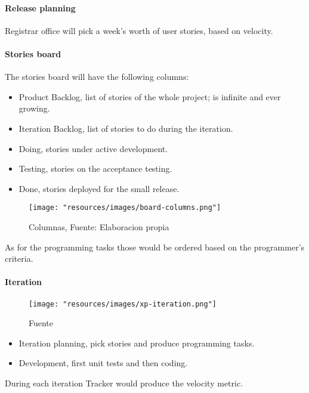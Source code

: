 \paragraph{Release planning} Registrar office will pick a week's worth of user stories, based on velocity.

\paragraph{Stories board} The stories board will have the following columns:
\begin{itemize}
    \item Product Backlog, list of stories of the whole project; is infinite and ever growing.
    \item Iteration Backlog, list of stories to do during the iteration.
    \item Doing, stories under active development.
    \item Testing, stories on the acceptance testing.
    \item Done, stories deployed for the small release.
\end{itemize}

\begin{figure}
    \texttt{[image: "resources/images/board-columns.png"]}
    \caption{Columnas, Fuente: Elaboracion propia}\label{fig:board-columns}
\end{figure}

As for the programming tasks those would be ordered based on the programmer's criteria.

\paragraph{Iteration}

\begin{figure}
    \texttt{[image: "resources/images/xp-iteration.png"]}
    \caption{Fuente \textcite{XpWeb}}\label{fig:xp-iteration}
\end{figure}

\begin{itemize}
    \item Iteration planning, pick stories and produce programming tasks.
    \item Development, first unit tests and then coding.
\end{itemize}

During each iteration Tracker would produce the velocity metric.

